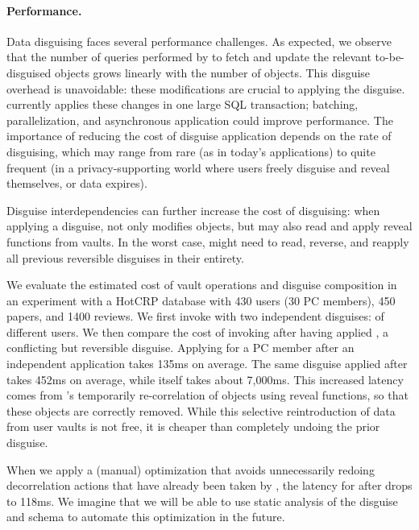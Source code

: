 \paragraph{Performance.}
\label{sec:perf}

Data disguising faces several performance challenges.
%
%
As expected, we observe that the number of queries performed by \sys to fetch and update
the relevant to-be-disguised objects grows linearly with the number of objects.
%
This disguise overhead is unavoidable: these modifications are crucial to applying the
disguise.
%
\sys currently applies these changes in one large SQL transaction; batching, parallelization,
and asynchronous application could improve performance.
%
The importance of reducing the cost of disguise application depends on the rate of
disguising, which may range from rare (as in today's applications) to quite frequent (in a
privacy-supporting world where users freely disguise and reveal themselves, or data expires).
%

%
Disguise interdependencies can further increase the cost of disguising: when applying a
disguise, \sys not only modifies objects, but may also read and apply reveal functions from
vaults.
%
In the worst case, \sys might need to read, reverse, and reapply all previous reversible
disguises in their entirety.
%

We evaluate the estimated cost of vault operations and disguise composition in an experiment
with a HotCRP database with 430 users (30 PC members), 450 papers, and 1400 reviews.
%
We first invoke \sys with two independent disguises: \hrtbf of different users.
%
We then compare the cost of invoking \hrtbf after having applied \hconfanon, a conflicting but reversible
disguise.
%
Applying \hrtbf for a PC member after an independent \hrtbf application takes 135ms on
average.
%
The same \hrtbf disguise applied after \hconfanon takes 452ms on average,
while \hconfanon itself takes about 7,000ms.
%
This increased latency comes from \sys's temporarily re-correlation of objects
using reveal functions, so that these objects are correctly removed.
%
While this selective reintroduction of data from user vaults is not free, it is cheaper than
completely undoing the prior \hconfanon disguise.
%

%
When we apply a (manual) optimization that avoids unnecessarily redoing decorrelation
actions that have already been taken by \hconfanon, the latency for \hrtbf after \hconfanon
drops to 118ms.
%
We imagine that we will be able to use static analysis of the disguise and schema to automate
this optimization in the future.
%
